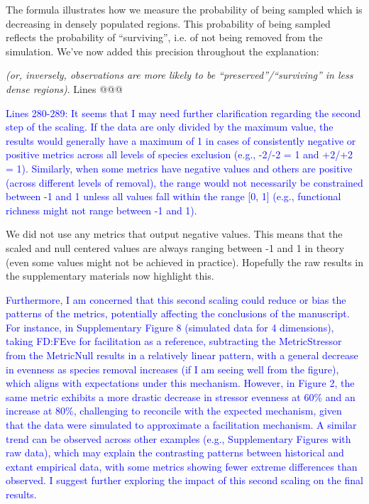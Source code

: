 \documentclass[
]{article}
\begin{document}
The formula illustrates how we measure the probability of being sampled which is decreasing in densely populated regions.
This probability of being sampled reflects the probability of ``surviving'', i.e. of not being removed from the simulation.
We've now added this precision throughout the explanation:

\textit{(or, inversely, observations are more likely to be ``preserved''/``surviving'' in less dense regions)}. Lines @@@

\textcolor{blue}{Lines 280-289: It seems that I may need further clarification regarding the second step of the scaling.
If the data are only divided by the maximum value, the results would generally have a maximum of 1 in cases of consistently negative or positive metrics across all levels of species exclusion (e.g., -2/-2 = 1 and +2/+2 = 1).
Similarly, when some metrics have negative values and others are positive (across different levels of removal), the range would not necessarily be constrained between -1 and 1 unless all values fall within the range [0, 1] (e.g., functional richness might not range between -1 and 1).}

We did not use any metrics that output negative values.
This means that the scaled and null centered values are always ranging between -1 and 1 in theory (even some values might not be achieved in practice).
Hopefully the raw results in the supplementary materials now highlight this.

\textcolor{blue}{Furthermore, I am concerned that this second scaling could reduce or bias the patterns of the metrics, potentially affecting the conclusions of the manuscript.
For instance, in Supplementary Figure 8 (simulated data for 4 dimensions), taking FD:FEve for facilitation as a reference, subtracting the MetricStressor from the MetricNull results in a relatively linear pattern, with a general decrease in evenness as species removal increases (if I am seeing well from the figure), which aligns with expectations under this mechanism.
However, in Figure 2, the same metric exhibits a more drastic decrease in stressor evenness at 60\% and an increase at 80\%, challenging to reconcile with the expected mechanism, given that the data were simulated to approximate a facilitation mechanism.
A similar trend can be observed across other examples (e.g., Supplementary Figures with raw data), which may explain the contrasting patterns between historical and extant empirical data, with some metrics showing fewer extreme differences than observed.
I suggest further exploring the impact of this second scaling on the final results.}
\end{document}
